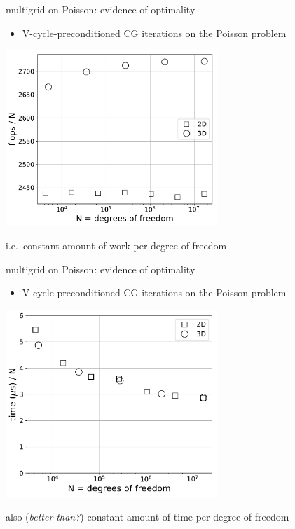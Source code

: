 \documentclass[hide notes,intlimits,usenames,dvipsnames]{beamer}
\begin{document}
\begin{frame}{multigrid on Poisson: evidence of optimality}
\begin{itemize}
\item V-cycle-preconditioned CG iterations on the Poisson problem
\end{itemize}

\begin{center}
\includegraphics[width=0.6\textwidth]{figs/optimal-flopsperN}

\small i.e.~constant amount of work per degree of freedom
\end{center}
\end{frame}


\begin{frame}{multigrid on Poisson: evidence of optimality}
\begin{itemize}
\item V-cycle-preconditioned CG iterations on the Poisson problem
\end{itemize}

\begin{center}
\includegraphics[width=0.6\textwidth]{figs/optimal-timeperN}

\small also (\emph{better than?}) constant amount of time per degree of freedom
\end{center}
\end{frame}
\end{document}
